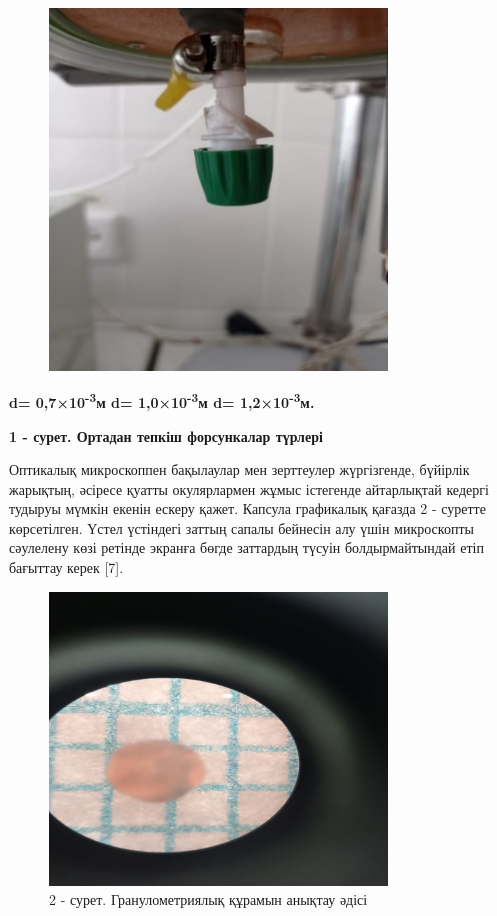 \begin{figure}[H]
	\centering
	\includegraphics[width=0.8\textwidth]{media/pish/image22}
	\caption*{}
\end{figure}


{\bfseries d= 0,7×10\textsuperscript{-3}м d= 1,0×10\textsuperscript{-3}м d=
1,2×10\textsuperscript{-3}м.}

{\bfseries 1 - сурет. Ортадан тепкіш форсункалар түрлері}

Оптикалық микроскоппен бақылаулар мен зерттеулер жүргізгенде, бүйірлік
жарықтың, әсіресе қуатты окулярлармен жұмыс істегенде айтарлықтай
кедергі тудыруы мүмкін екенін ескеру қажет. Капсула графикалық қағазда 2
- суретте көрсетілген. Үстел үстіндегі заттың сапалы бейнесін алу үшін
микроскопты сәулелену көзі ретінде экранға бөгде заттардың түсуін
болдырмайтындай етіп бағыттау керек {[}7{]}.


\begin{figure}[H]
	\centering
	\includegraphics[width=0.8\textwidth]{media/pish/image23}
	\caption*{2 - сурет. Гранулометриялық құрамын анықтау әдісі}
\end{figure}

